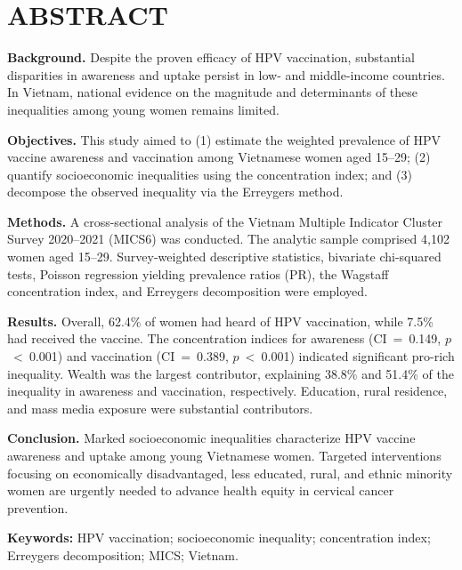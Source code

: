 \chapter*{ABSTRACT}
{}

\textbf{Background.} Despite the proven efficacy of HPV vaccination, substantial disparities in awareness and uptake persist in low- and middle-income countries. In Vietnam, national evidence on the magnitude and determinants of these inequalities among young women remains limited.

\textbf{Objectives.} This study aimed to (1) estimate the weighted prevalence of HPV vaccine awareness and vaccination among Vietnamese women aged 15--29; (2) quantify socioeconomic inequalities using the concentration index; and (3) decompose the observed inequality via the Erreygers method.

\textbf{Methods.} A cross-sectional analysis of the Vietnam Multiple Indicator Cluster Survey 2020--2021 (MICS6) was conducted. The analytic sample comprised 4,102 women aged 15--29. Survey-weighted descriptive statistics, bivariate chi-squared tests, Poisson regression yielding prevalence ratios (PR), the Wagstaff concentration index, and Erreygers decomposition were employed.

\textbf{Results.} Overall, 62.4\% of women had heard of HPV vaccination, while 7.5\% had received the vaccine. The concentration indices for awareness (CI~=~0.149, $p$~<~0.001) and vaccination (CI~=~0.389, $p$~<~0.001) indicated significant pro-rich inequality. Wealth was the largest contributor, explaining 38.8\% and 51.4\% of the inequality in awareness and vaccination, respectively. Education, rural residence, and mass media exposure were substantial contributors.

\textbf{Conclusion.} Marked socioeconomic inequalities characterize HPV vaccine awareness and uptake among young Vietnamese women. Targeted interventions focusing on economically disadvantaged, less educated, rural, and ethnic minority women are urgently needed to advance health equity in cervical cancer prevention.

\textbf{Keywords:} HPV vaccination; socioeconomic inequality; concentration index; Erreygers decomposition; MICS; Vietnam.

\clearpage